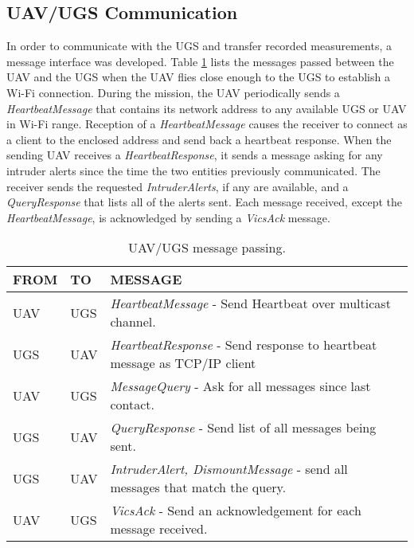 \documentclass[letterpaper, 12 pt, conference]{ieeeconf}  %
\theoremstyle{definition}
\begin{document}
\subsection{UAV/UGS Communication}
In order to communicate with the UGS and transfer recorded measurements, a message interface was developed. Table \ref{fig:ACCA_IUGS_MESSAGE_PASSING} lists the messages passed between the UAV and the UGS when the UAV flies close enough to the UGS to establish a Wi-Fi connection. During the mission, the UAV periodically sends a \textit{HeartbeatMessage} that contains its network address to any available UGS or UAV in Wi-Fi range. Reception of a \textit{HeartbeatMessage} causes the receiver to connect as a client to the enclosed address and send back a heartbeat response. When the sending UAV receives a \textit{HeartbeatResponse}, it sends a message asking for any intruder alerts since the time the two entities previously communicated. The receiver sends the requested \textit{IntruderAlerts}, if any are available, and a \textit{QueryResponse} that lists all of the alerts sent. Each message received, except the \textit{HeartbeatMessage}, is acknowledged by sending a \textit{VicsAck} message.
\begin{table}
\caption{UAV/UGS message passing.}
\label{fig:ACCA_IUGS_MESSAGE_PASSING}
\begin{center}
\begin{tabular}{|m{1.0cm}|m{1.0cm}|m{4.8cm}|}\hline
 \textbf{FROM}  & \textbf{TO}     & \textbf{MESSAGE}\\ \hline \hline
UAV & UGS & \emph{HeartbeatMessage} - Send Heartbeat over multicast channel.\\ \hline
UGS & UAV & \emph{HeartbeatResponse} - Send response to heartbeat message as TCP/IP client\\ \hline
UAV & UGS & \emph{MessageQuery} - Ask for all messages since last contact.\\ \hline
UGS & UAV & \emph{QueryResponse} - Send list of all messages being sent.\\ \hline
UGS & UAV & \emph{IntruderAlert, DismountMessage} - send all messages that match the query.\\ \hline
UAV & UGS & \emph{VicsAck} - Send an acknowledgement for each message received.\\ \hline
\end{tabular}
\end{center}
\end{table}
\end{document}

